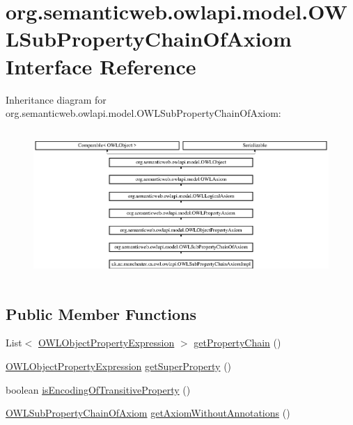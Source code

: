 \hypertarget{interfaceorg_1_1semanticweb_1_1owlapi_1_1model_1_1_o_w_l_sub_property_chain_of_axiom}{\section{org.\-semanticweb.\-owlapi.\-model.\-O\-W\-L\-Sub\-Property\-Chain\-Of\-Axiom Interface Reference}
\label{interfaceorg_1_1semanticweb_1_1owlapi_1_1model_1_1_o_w_l_sub_property_chain_of_axiom}
}
Inheritance diagram for org.\-semanticweb.\-owlapi.\-model.\-O\-W\-L\-Sub\-Property\-Chain\-Of\-Axiom\-:\begin{figure}[H]
\begin{center}
\leavevmode
\includegraphics[height=5.714285cm]{interfaceorg_1_1semanticweb_1_1owlapi_1_1model_1_1_o_w_l_sub_property_chain_of_axiom}
\end{center}
\end{figure}
\subsection*{Public Member Functions}
\begin{DoxyCompactItemize}
\item 
List$<$ \hyperlink{interfaceorg_1_1semanticweb_1_1owlapi_1_1model_1_1_o_w_l_object_property_expression}{O\-W\-L\-Object\-Property\-Expression} $>$ \hyperlink{interfaceorg_1_1semanticweb_1_1owlapi_1_1model_1_1_o_w_l_sub_property_chain_of_axiom_a7a9b882a8d034009494aff98e70a8e56}{get\-Property\-Chain} ()
\item 
\hyperlink{interfaceorg_1_1semanticweb_1_1owlapi_1_1model_1_1_o_w_l_object_property_expression}{O\-W\-L\-Object\-Property\-Expression} \hyperlink{interfaceorg_1_1semanticweb_1_1owlapi_1_1model_1_1_o_w_l_sub_property_chain_of_axiom_a8d550674505297d01205b9391f3a226e}{get\-Super\-Property} ()
\item 
boolean \hyperlink{interfaceorg_1_1semanticweb_1_1owlapi_1_1model_1_1_o_w_l_sub_property_chain_of_axiom_af4e1cb9a1d76daea049618708a1a4e03}{is\-Encoding\-Of\-Transitive\-Property} ()
\item 
\hyperlink{interfaceorg_1_1semanticweb_1_1owlapi_1_1model_1_1_o_w_l_sub_property_chain_of_axiom}{O\-W\-L\-Sub\-Property\-Chain\-Of\-Axiom} \hyperlink{interfaceorg_1_1semanticweb_1_1owlapi_1_1model_1_1_o_w_l_sub_property_chain_of_axiom_a59ed8fe751c141496a96c0a26af0d0fc}{get\-Axiom\-Without\-Annotations} ()
\end{DoxyCompactItemize}


